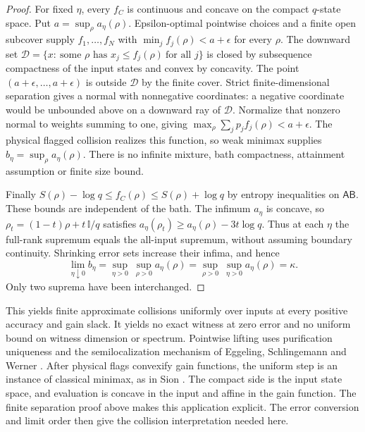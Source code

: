 \documentclass[11pt,a4paper]{article}
\numberwithin{equation}{section}
\theoremstyle{plain}
\theoremstyle{definition}
\newcommand{\rg}[1]{\mathsf{#1}}
\newcommand{\one}{\mathbb{I}}
\begin{document}
\begin{proof}
For fixed $\eta$, every $f_C$ is continuous and concave on the compact
$q$-state space. Put $a=\sup_\rho a_\eta(\rho)$. Epsilon-optimal pointwise
choices and a finite open subcover supply $f_1,\dots,f_N$ with
$\min_j f_j(\rho)<a+\epsilon$ for every $\rho$. The downward set
$\mathcal{D}=\{x:\ \text{some }\rho\text{ has }x_j\le f_j(\rho)\ \text{for all }j\}$
is closed by subsequence compactness of the input states and convex by
concavity. The point $(a+\epsilon,\dots,a+\epsilon)$ is outside $\mathcal{D}$
by the finite cover. Strict finite-dimensional separation gives a normal with
nonnegative coordinates: a negative coordinate would be unbounded above on a
downward ray of $\mathcal{D}$. Normalize that nonzero normal to weights
summing to one, giving $\max_\rho\sum_j p_j f_j(\rho)<a+\epsilon$. The
physical flagged collision realizes this function, so weak minimax supplies
$b_\eta=\sup_\rho a_\eta(\rho)$. There is no infinite mixture, bath
compactness, attainment assumption or finite size bound.

Finally $S(\rho)-\log q\le f_C(\rho)\le S(\rho)+\log q$ by entropy
inequalities on $\rg{A}\rg{B}$. These bounds are independent of the bath. The
infimum $a_\eta$ is concave, so $\rho_t=(1-t)\rho+t\,\one/q$ satisfies
$a_\eta(\rho_t)\ge a_\eta(\rho)-3t\log q$. Thus at each $\eta$ the full-rank
supremum equals the all-input supremum, without assuming boundary continuity.
Shrinking error sets increase their infima, and hence
\begin{equation}
\label{eq:gain-minimax}
\lim_{\eta\downarrow 0}b_\eta
=\sup_{\eta>0}\ \sup_{\rho>0}a_\eta(\rho)
=\sup_{\rho>0}\ \sup_{\eta>0}a_\eta(\rho)=\kappa .
\end{equation}
Only two suprema have been interchanged.
\end{proof}

This yields finite approximate collisions uniformly over inputs at every
positive accuracy and gain slack. It yields no exact witness at zero error and
no uniform bound on witness dimension or spectrum. Pointwise lifting uses
purification uniqueness and the semilocalization mechanism of Eggeling,
Schlingemann and Werner \cite[section III]{Eggeling2002}. After physical flags convexify gain
functions, the uniform step is an instance of classical minimax, as in Sion
\cite[Theorem 4.2 (Kneser--Fan), p.~175]{Sion1958}. The compact side is the
input state space, and evaluation is concave in the input and affine in the
gain function. The finite separation proof above makes this application
explicit. The error conversion and limit order then give the collision
interpretation needed here.
\end{document}
